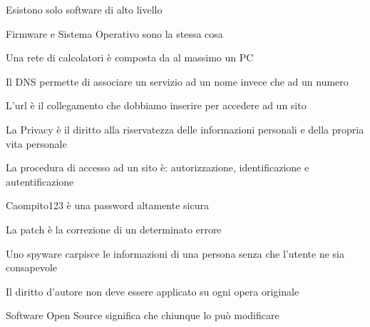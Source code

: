 \documentclass[addpoints]{exam}
\newcommand{\tf}[1][{}]{%
	\fillin[#1][0.25in]%
}
\begin{document}
\begin{multicols}{2}
\begin{questions}
\question[1] \tf[F] Esistono solo software di alto livello

\question[1] \tf[F] Firmware e Sistema Operativo sono la stessa cosa

\question[1] \tf[F] Una rete di calcolatori è composta da al massimo un PC

\question[1] \tf[T] Il DNS permette di associare un servizio ad un nome invece che ad un numero

\question[1] \tf[T] L'url è il collegamento che dobbiamo inserire per accedere ad un sito

\question[1] \tf[T] La Privacy è il diritto alla riservatezza delle informazioni personali e della propria vita personale

\question[1] \tf[F] La procedura di accesso ad un sito è: autorizzazione, identificazione e autentificazione

\question[1] \tf[F] Caompito123 è una password altamente sicura

\question[1] \tf[T] La patch è la correzione di un determinato errore

\question[1] \tf[T] Uno spyware carpisce le informazioni di una persona senza che l'utente ne sia consapevole

\question[1] \tf[F] Il diritto d'autore non deve essere applicato su ogni opera originale

\question[1] \tf[F] Software Open Source significa che chiunque lo può modificare

\end{questions}
\end{multicols}
\end{document}
